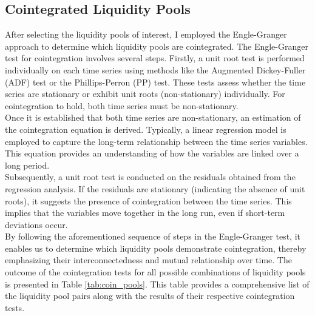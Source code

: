 \subsection{Cointegrated Liquidity Pools}
After selecting the liquidity pools of interest, I employed the Engle-Granger approach to determine which liquidity pools are cointegrated. The Engle-Granger test for cointegration involves several steps. Firstly, a unit root test is performed individually on each time series using methods like the Augmented Dickey-Fuller (ADF) test or the Phillips-Perron (PP) test. These tests assess whether the time series are stationary or exhibit unit roots (non-stationary) individually. For cointegration to hold, both time series must be non-stationary.
\\[5mm]
Once it is established that both time series are non-stationary, an estimation of the cointegration equation is derived. Typically, a linear regression model is employed to capture the long-term relationship between the time series variables. This equation provides an understanding of how the variables are linked over a long period.
\\[5mm]
Subsequently, a unit root test is conducted on the residuals obtained from the regression analysis. If the residuals are stationary (indicating the absence of unit roots), it suggests the presence of cointegration between the time series. This implies that the variables move together in the long run, even if short-term deviations occur.
\\[5mm]
By following the aforementioned sequence of steps in the Engle-Granger test, it enables us to determine which liquidity pools demonstrate cointegration, thereby emphasizing their interconnectedness and mutual relationship over time. The outcome of the cointegration tests for all possible combinations of liquidity pools is presented in Table \ref{tab:coin_pools}. This table provides a comprehensive list of the liquidity pool pairs along with the results of their respective cointegration tests.
